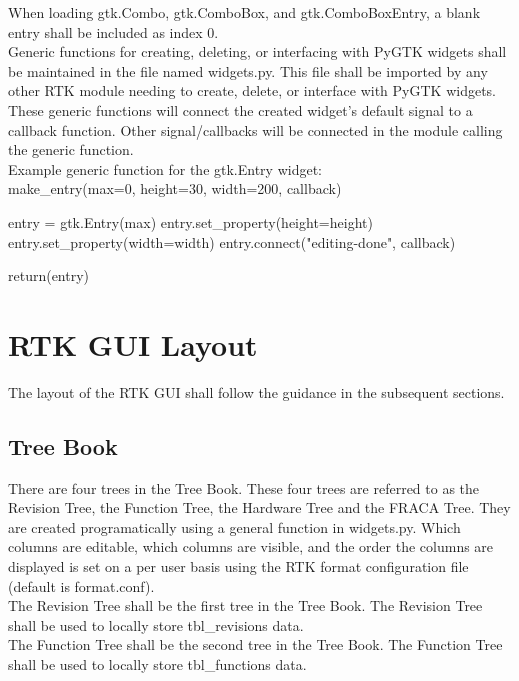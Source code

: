 \documentclass[11pt, 12pt, twoside, onecolumn]{article}
\begin{document}
\noindent When loading gtk.Combo, gtk.ComboBox, and gtk.ComboBoxEntry, a blank entry shall be included as index 0. \\

\noindent Generic functions for creating, deleting, or interfacing with PyGTK widgets shall be maintained in the file named widgets.py.  This file shall be imported by any other RTK module needing to create, delete, or interface with PyGTK widgets.  These generic functions will connect the created widget's default signal to a callback function.  Other signal/callbacks will be connected in the module calling the generic function. \\

\noindent Example generic function for the gtk.Entry widget: \\

        make\_entry(max=0, height=30, width=200, callback)

            entry = gtk.Entry(max)
            entry.set\_property(height=height)
            entry.set\_property(width=width)
            entry.connect("editing-done", callback)

            return(entry)

\section{\bf \Large RTK GUI Layout}

\noindent The layout of the RTK GUI shall follow the guidance in the subsequent sections.

\subsection{\bf \large Tree Book}

\noindent There are four trees in the Tree Book.  These four trees are referred to as the Revision Tree, the Function Tree, the Hardware Tree and the FRACA Tree.  They are created programatically using a general function in widgets.py.  Which columns are editable, which columns are visible, and the order the columns are displayed is set on a per user basis using the RTK format configuration file (default is format.conf). \\

\noindent The Revision Tree shall be the first tree in the Tree Book.  The Revision Tree shall be used to locally store tbl\_revisions data. \\

\noindent The Function Tree shall be the second tree in the Tree Book.  The Function Tree shall be used to locally store tbl\_functions data. \\
\end{document}
